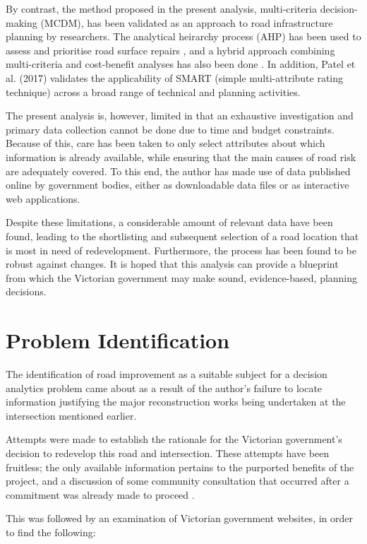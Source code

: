 \documentclass[11pt, a4paper]{article}
\begin{document}
    By contrast, the method proposed in the present analysis, multi-criteria decision-making (MCDM), has been validated as an approach to road infrastructure planning by researchers. The analytical heirarchy process (AHP) has been used to assess and prioritise road surface repairs \parencite{a4}, and a hybrid approach combining multi-criteria and cost-benefit analyses has also been done \parencite{a5}. In addition, Patel et al. (2017) validates the applicability of SMART (simple multi-attribute rating technique) across a broad range of technical and planning activities.

    The present analysis is, however, limited in that an exhaustive investigation and primary data collection cannot be done due to time and budget constraints. Because of this, care has been taken to only select attributes about which information is already available, while ensuring that the main causes of road risk are adequately covered. To this end, the author has made use of data published online by government bodies, either as downloadable data files or as interactive web applications.

    Despite these limitations, a considerable amount of relevant data have been found, leading to the shortlisting and subsequent selection of a road location that is most in need of redevelopment. Furthermore, the process has been found to be robust against changes. It is hoped that this analysis can provide a blueprint from which the Victorian government may make sound, evidence-based, planning decisions.

    \section{Problem Identification}

    The identification of road improvement as a suitable subject for a decision analytics problem came about as a result of the author's failure to locate information justifying the major reconstruction works being undertaken at the intersection mentioned earlier. 

    Attempts were made to establish the rationale for the Victorian government's decision to redevelop this road and intersection. These attempts have been fruitless; the only available information pertains to the purported benefits of the project, and a discussion of some community consultation that occurred after a commitment was already made to proceed \parencite{a7}. 

    This was followed by an examination of Victorian government websites, in order to find the following:
\end{document}

